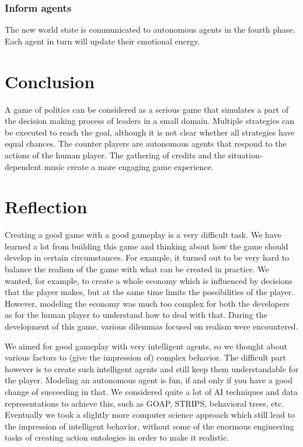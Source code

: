 \documentclass[11pt,a4paper]{article}
\begin{document}
    \subsubsection{Inform agents}
      The new world state is communicated to autonomous agents in the fourth phase. Each agent in turn will update their emotional energy. 

\section{Conclusion}
A game of politics can be considered as a serious game that simulates a part of the decision making process of leaders in a small domain. Multiple strategies can be executed to reach the goal, although it is not clear whether all strategies have equal chances. The counter players are autonomous agents that respond to the actions of the human player. The gathering of credits and the situation-dependent music create a more engaging game experience.

\section{Reflection}
Creating a good game with a good gameplay is a very difficult task. We have learned a lot from building this game and thinking about how the game should develop in certain circumstances. For example, it turned out to be very hard to balance the realism of the game with what can be created in practice. We wanted, for example, to create a whole economy which is influenced by decisions that the player makes, but at the same time limits the possibilities of the player. However, modeling the economy was much too complex for both the developers as for the human player to understand how to deal with that. During the development of this game, various dilemmas focused on realism were encountered. 

We aimed for good gameplay with very intelligent agents, so we thought about various factors to (give the impression of) complex behavior. The difficult part however is to create such intelligent agents and still keep them understandable for the player. Modeling an autonomous agent is fun, if and only if you have a good change of succeeding in that. We considered quite a lot of AI techniques and data representations to achieve this, such as GOAP, STRIPS, behavioral trees, etc. Eventually we took a slightly more computer science approach which still lead to the impression of intelligent behavior, without some of the enormous engineering tasks of creating action ontologies in order to make it realistic.
\end{document}
